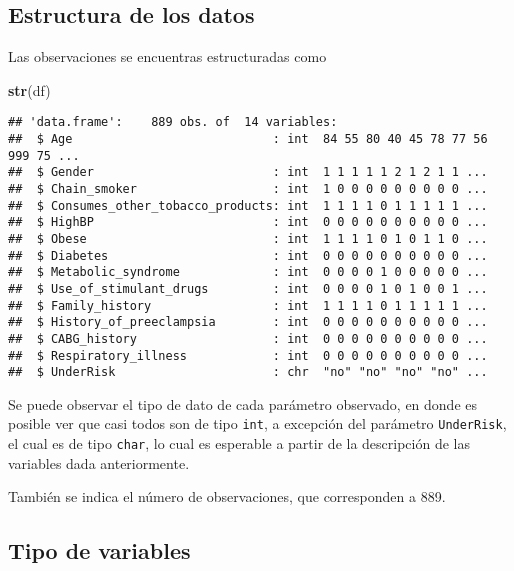 \documentclass[
  10pt,
  spanish,
]{article}
\newenvironment{Shaded}{\begin{snugshade}}{\end{snugshade}}
\newcommand{\KeywordTok}[1]{\textcolor[rgb]{0.13,0.29,0.53}{\textbf{#1}}}
\newcommand{\NormalTok}[1]{#1}
\begin{document}
\hypertarget{estructura-de-los-datos}{%
\subsection{Estructura de los datos}\label{estructura-de-los-datos}}

Las observaciones se encuentras estructuradas como

\begin{Shaded}
\begin{Highlighting}[]
\KeywordTok{str}\NormalTok{(df)}
\end{Highlighting}
\end{Shaded}

\begin{verbatim}
## 'data.frame':    889 obs. of  14 variables:
##  $ Age                            : int  84 55 80 40 45 78 77 56 999 75 ...
##  $ Gender                         : int  1 1 1 1 1 2 1 2 1 1 ...
##  $ Chain_smoker                   : int  1 0 0 0 0 0 0 0 0 0 ...
##  $ Consumes_other_tobacco_products: int  1 1 1 1 0 1 1 1 1 1 ...
##  $ HighBP                         : int  0 0 0 0 0 0 0 0 0 0 ...
##  $ Obese                          : int  1 1 1 1 0 1 0 1 1 0 ...
##  $ Diabetes                       : int  0 0 0 0 0 0 0 0 0 0 ...
##  $ Metabolic_syndrome             : int  0 0 0 0 1 0 0 0 0 0 ...
##  $ Use_of_stimulant_drugs         : int  0 0 0 0 1 0 1 0 0 1 ...
##  $ Family_history                 : int  1 1 1 1 0 1 1 1 1 1 ...
##  $ History_of_preeclampsia        : int  0 0 0 0 0 0 0 0 0 0 ...
##  $ CABG_history                   : int  0 0 0 0 0 0 0 0 0 0 ...
##  $ Respiratory_illness            : int  0 0 0 0 0 0 0 0 0 0 ...
##  $ UnderRisk                      : chr  "no" "no" "no" "no" ...
\end{verbatim}

Se puede observar el tipo de dato de cada parámetro observado, en donde
es posible ver que casi todos son de tipo \texttt{int}, a excepción del
parámetro \texttt{UnderRisk}, el cual es de tipo \texttt{char}, lo cual
es esperable a partir de la descripción de las variables dada
anteriormente.

También se indica el número de observaciones, que corresponden a 889.

\hypertarget{tipo-de-variables}{%
\subsection{Tipo de variables}\label{tipo-de-variables}}
\end{document}
